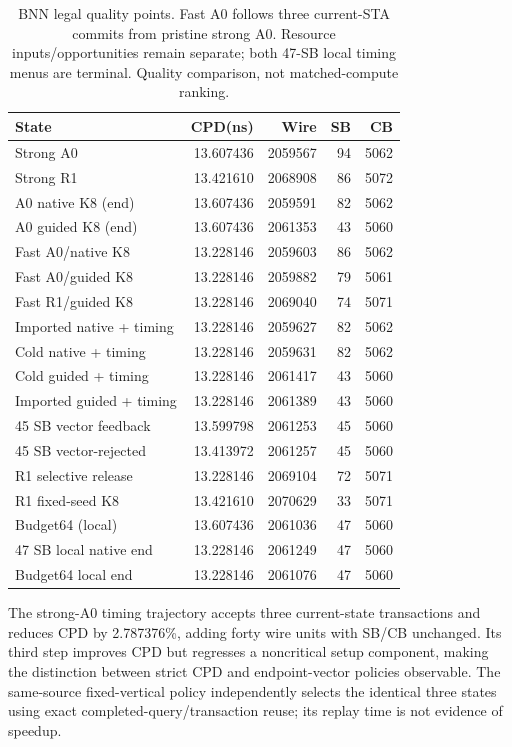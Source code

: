 \documentclass[conference,10pt]{IEEEtran}
\begin{document}
\begin{table}[t]
\centering\caption{BNN legal quality points. Fast A0 follows three current-STA commits from pristine strong A0. Resource inputs/opportunities remain separate; both 47-SB local timing menus are terminal. Quality comparison, not matched-compute ranking.}
\label{tab:bnn}
\small
\begin{tabular}{lrrrr}\hline
State & CPD(ns) & Wire & SB & CB\\\hline
Strong A0 &13.607436&2059567&94&5062\\
Strong R1 &13.421610&2068908&86&5072\\
A0 native K8 (end) &13.607436&2059591&82&5062\\
A0 guided K8 (end) &13.607436&2061353&43&5060\\
Fast A0/native K8 &13.228146&2059603&86&5062\\
Fast A0/guided K8 &13.228146&2059882&79&5061\\
Fast R1/guided K8 &13.228146&2069040&74&5071\\
Imported native + timing &13.228146&2059627&82&5062\\
Cold native + timing &13.228146&2059631&82&5062\\
Cold guided + timing &13.228146&2061417&43&5060\\
Imported guided + timing &13.228146&2061389&43&5060\\
45 SB vector feedback &13.599798&2061253&45&5060\\
45 SB vector-rejected &13.413972&2061257&45&5060\\
R1 selective release &13.228146&2069104&72&5071\\
R1 fixed-seed K8 &13.421610&2070629&33&5071\\
Budget64 (local) &13.607436&2061036&47&5060\\
47 SB local native end &13.228146&2061249&47&5060\\
Budget64 local end &13.228146&2061076&47&5060\\\hline
\end{tabular}
\end{table}
The strong-A0 timing trajectory accepts three current-state transactions and reduces CPD by 2.787376\%, adding forty wire units with SB/CB unchanged. Its third step improves CPD but regresses a noncritical setup component, making the distinction between strict CPD and endpoint-vector policies observable. The same-source fixed-vertical policy independently selects the identical three states using exact completed-query/transaction reuse; its replay time is not evidence of speedup.
\end{document}
